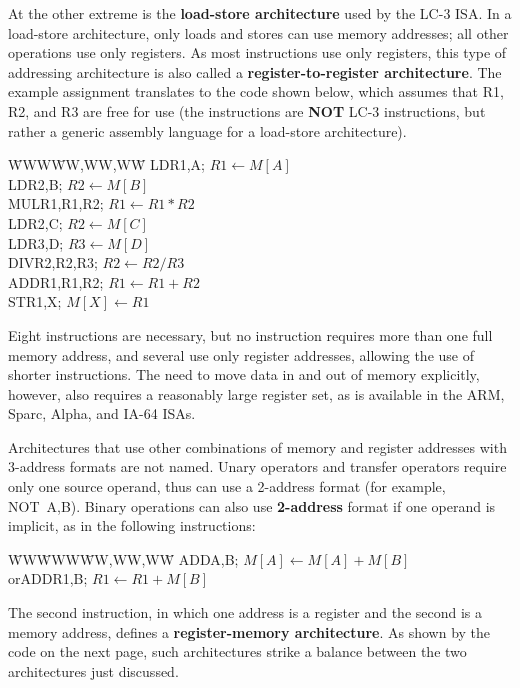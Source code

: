 At the other extreme is the {\bf load-store architecture} used by the
\mbox{LC-3} ISA.  In a load-store architecture, only
loads and stores can use memory addresses; all other operations use
only registers.  As most instructions use only registers, this type of
addressing architecture is also called a {\bf register-to-register
architecture}.  The example assignment translates to the code shown below,
which assumes that R1, R2, and R3 are free for use (the instructions
are {\bf NOT} \mbox{LC-3} instructions, but rather a generic assembly
language for a load-store architecture). 

\vspace{-6pt}\begin{tabbing}
\hspace{.5in}\=WWW\=WW,WW,WW\=\kill
\>LD\>R1,A\>; $R1 \leftarrow M[A]$\\
\>LD\>R2,B\>; $R2 \leftarrow M[B]$\\
\>MUL\>R1,R1,R2\>; $R1 \leftarrow R1 * R2$\\
\>LD\>R2,C\>; $R2 \leftarrow M[C]$\\
\>LD\>R3,D\>; $R3 \leftarrow M[D]$\\
\>DIV\>R2,R2,R3\>; $R2 \leftarrow R2 / R3$\\
\>ADD\>R1,R1,R2\>; $R1 \leftarrow R1 + R2$\\
\>ST\>R1,X\>; $M[X] \leftarrow R1$
\end{tabbing}\vspace{-6pt}
%
Eight instructions are necessary, but no instruction requires more
than one full memory address, and several use only register addresses,
allowing the use of shorter instructions.  The need to move data in
and out of memory explicitly, however, also requires a reasonably
large register set, as is available in the ARM, Sparc, Alpha, and IA-64
ISAs.  

Architectures that use other combinations of memory and register
addresses with \mbox{3-address} formats are not named.  Unary
operators and transfer operators require only one source operand, thus
can use a \mbox{2-address} format (for example, NOT~A,B).  Binary operations
can also use {\bf \mbox{2-address}} format if one operand is implicit,
as in the following instructions:
%
\vspace{-6pt}\begin{tabbing}
\hspace{.5in}\=WW\=WWW\=WW,WW,WW\=\kill
\>\>ADD\>A,B\>; $M[A] \leftarrow M[A] + M[B]$\\
\>or\>ADD\>R1,B\>; $R1 \leftarrow R1 + M[B]$
\end{tabbing}\vspace{-6pt}
%
The second instruction, in which one address is a register and the
second is a memory address, defines a {\bf register-memory
architecture}.  As shown by the code on the next page, 
such architectures strike a balance
between the two architectures just discussed.

